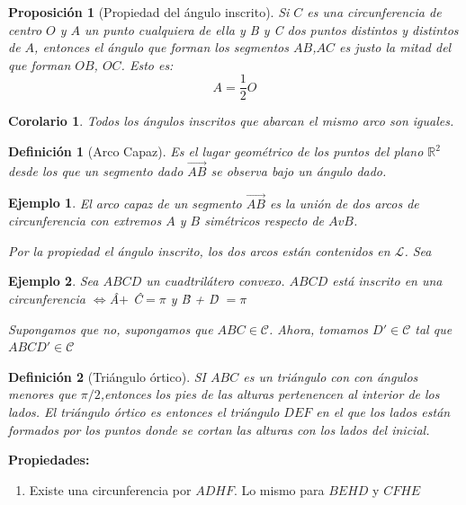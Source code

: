 \documentclass[11pt, a4paper]{article}
\makeatletter
\newif\IfInSansMode
\let\oldsf\sffamily
\renewcommand*{\sffamily}{\oldsf\mathversion{sans}\InSansModetrue}
\let\oldnorm\normalfont
\renewcommand*{\normalfont}{\oldnorm\InSansModefalse\mathversion{normal}}
\renewenvironment{proof}[1][\proofname] {\vspace{-15pt}\par\pushQED{\qed}\normalfont\topsep6\p@\@plus6\p@\relax\trivlist\item[\hskip\labelsep\it#1\@addpunct{.}]\ignorespaces}{\popQED\endtrivlist\@endpefalse}
\newcommand{\R}{\mathbb{R}}
\renewcommand{\vec}{\overrightarrow}
\renewenvironment{proof}[1][\proofname] {\par\pushQED{\qed}\normalfont\topsep6\p@\@plus6\p@\relax\trivlist\item[\hskip\labelsep\itshape\sffamily#1\@addpunct{.}]\ignorespaces}{\popQED\endtrivlist\@endpefalse}
\theoremstyle{theorem-style}
\newtheorem{nprop}{Proposición}[section]
\newtheorem{ncor}{Corolario}[section]
\theoremstyle{definition-style}
\newtheorem{ndef}{Definición}[section]
\theoremstyle{remark-style}
\theoremstyle{example-style}
\newtheorem{ejemplo}{Ejemplo}[section]
\newenvironment{nlist}
{\begin{enumerate}
    \renewcommand\labelenumi{(\emph{\roman{enumi})}}}
  {\end{enumerate}}
\makeatother
\begin{document}
\begin{nprop}[Propiedad del ángulo inscrito]
  Si $C$ es una circunferencia de centro $O$ y $A$ un punto cualquiera de ella y B y C dos puntos distintos y distintos de $A$, entonces el ángulo que forman los segmentos $AB$,$AC$ es justo la mitad del que forman $OB$, $OC$. Esto es:
  \[
    A = \dfrac{1}{2} O
  \]
\end{nprop}
\begin{ncor}
  Todos los ángulos inscritos que abarcan el mismo arco son iguales.
\end{ncor}

\begin{ndef}[Arco Capaz]
	Es el lugar geométrico de los puntos del plano $\R^2$ desde los que un segmento dado $\vec{AB}$ se observa bajo un ángulo dado.
\end{ndef}

\begin{ejemplo}
	El arco capaz de un segmento $\vec{AB}$ es la unión de dos arcos de circunferencia con extremos $A$ y $B$ simétricos respecto de $AvB$.
	
	\begin{proof}[Solución]
	Por la propiedad el ángulo inscrito, los dos arcos están contenidos en $\mathcal L$. Sea 
	
\end{proof}
\end{ejemplo}
\begin{ejemplo}
	Sea $ABCD$ un cuadtrilátero convexo. $ABCD$ está inscrito en una circunferencia $\iff $\^{A}$ +$ \^{C}$ = \pi$ y \^{B} + \^{D} $ = \pi$
	\begin{proof}
	Supongamos que no, supongamos que $ABC \in \mathcal C$. Ahora, tomamos $D' \in \mathcal C$ tal que $ABCD' \in \mathcal C $
\end{proof}
\end{ejemplo}

\begin{ndef}[Triángulo órtico]
	SI $ABC$ es un triángulo con con ángulos menores que $\pi/2$,entonces los pies de las alturas pertenencen al interior de los lados. El triángulo órtico es entonces el triángulo $DEF$ en el que los lados están formados por los puntos donde se cortan las alturas con los lados del inicial.
\end{ndef}

\textbf{Propiedades:}\\
\begin{nlist}
	\item Existe una circunferencia por $ADHF$. Lo mismo para $BEHD$ y $CFHE$
\end{nlist}
\end{document}
